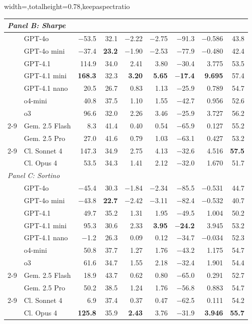 \begin{table}[H]
\begin{adjustbox}{width=\textwidth,totalheight=0.78\textheight,keepaspectratio}
\begin{tabular}{ll rrrrrrr}
\midrule
\multicolumn{9}{l}{\textit{Panel B: Sharpe}} \\
\midrule
& GPT-4o & $-$53.5 & 32.1 & $-$2.22 & $-$2.75 & $-$91.3 & $-$0.586 & 43.8 \\
& GPT-4o mini & $-$37.4 & \textbf{23.2} & $-$1.90 & $-$2.53 & $-$77.9 & $-$0.480 & 42.4 \\
& GPT-4.1 & 114.9 & 34.0 & 2.41 & 3.80 & $-$30.4 & 3.775 & 53.5 \\
& GPT-4.1 mini & \textbf{168.3} & 32.3 & \textbf{3.20} & \textbf{5.65} & \textbf{$-$17.4} & \textbf{9.695} & 57.4 \\
& GPT-4.1 nano & 20.5 & 26.7 & 0.83 & 1.13 & $-$25.9 & 0.789 & 54.7 \\
& o4-mini & 40.8 & 37.5 & 1.10 & 1.55 & $-$42.7 & 0.956 & 52.6 \\
& o3 & 96.6 & 32.0 & 2.26 & 3.46 & $-$25.9 & 3.727 & 56.2 \\
\cmidrule(l){2-9}
& Gem. 2.5 Flash & 8.3 & 41.4 & 0.40 & 0.54 & $-$65.9 & 0.127 & 55.2 \\
& Gem. 2.5 Pro & 27.0 & 41.6 & 0.79 & 1.03 & $-$63.1 & 0.427 & 53.2 \\
\cmidrule(l){2-9}
& Cl. Sonnet 4 & 147.3 & 34.9 & 2.75 & 4.13 & $-$32.6 & 4.516 & \textbf{57.5} \\
& Cl. Opus 4 & 53.5 & 34.3 & 1.41 & 2.12 & $-$32.0 & 1.670 & 51.7 \\
\midrule
\multicolumn{9}{l}{\textit{Panel C: Sortino}} \\
\midrule
& GPT-4o & $-$45.4 & 30.3 & $-$1.84 & $-$2.34 & $-$85.5 & $-$0.531 & 44.7 \\
& GPT-4o mini & $-$43.8 & \textbf{22.7} & $-$2.42 & $-$3.11 & $-$82.4 & $-$0.532 & 40.7 \\
& GPT-4.1 & 49.7 & 35.2 & 1.31 & 1.95 & $-$49.5 & 1.004 & 50.2 \\
& GPT-4.1 mini & 95.3 & 30.6 & 2.33 & \textbf{3.95} & \textbf{$-$24.2} & 3.945 & 53.2 \\
& GPT-4.1 nano & $-$1.2 & 26.3 & 0.09 & 0.12 & $-$34.7 & $-$0.034 & 52.3 \\
& o4-mini & 50.8 & 37.7 & 1.27 & 1.76 & $-$43.2 & 1.175 & 54.7 \\
& o3 & 61.6 & 34.7 & 1.55 & 2.18 & $-$32.4 & 1.901 & 54.4 \\
\cmidrule(l){2-9}
& Gem. 2.5 Flash & 18.9 & 43.7 & 0.62 & 0.80 & $-$65.0 & 0.291 & 52.7 \\
& Gem. 2.5 Pro & 50.2 & 38.5 & 1.24 & 1.76 & $-$56.8 & 0.883 & 54.7 \\
\cmidrule(l){2-9}
& Cl. Sonnet 4 & 6.9 & 37.4 & 0.37 & 0.47 & $-$62.5 & 0.111 & 54.2 \\
& Cl. Opus 4 & \textbf{125.8} & 35.9 & \textbf{2.43} & 3.76 & $-$31.9 & \textbf{3.946} & \textbf{55.7} \\
\bottomrule
\end{tabular}
\end{adjustbox}
\end{table}

